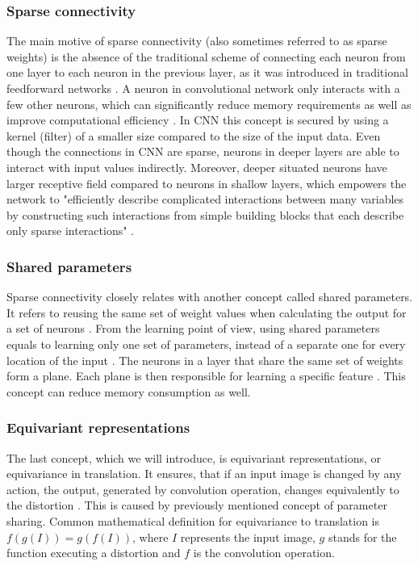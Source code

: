\subsubsection*{Sparse connectivity}
The main motive of sparse connectivity (also sometimes referred to as sparse weights) is the absence of the traditional scheme of connecting each neuron from one layer to each neuron in the previous layer, as it was introduced in traditional feedforward networks \cite{chapterBookDL}. A neuron in convolutional network only interacts with a few other neurons, which can significantly reduce memory requirements as well as improve computational efficiency \cite{deeplearningbook}. In CNN this concept is secured by using a kernel (filter) of a smaller size compared to the size of the input data. Even though the connections in CNN are sparse, neurons in deeper layers are able to interact with input values indirectly. Moreover, deeper situated neurons have larger receptive field compared to neurons in shallow layers, which empowers the network to "efficiently describe complicated interactions between many variables by constructing such interactions from simple building blocks that each describe only sparse interactions" \cite{deeplearningbook}.
\subsubsection*{Shared parameters}
Sparse connectivity closely relates with another concept called shared parameters. It refers to reusing the same set of weight values when calculating the output for a set of neurons \cite{greekDeepLearning}. From the learning point of view, using shared parameters equals to learning only one set of parameters, instead of a separate one for every location of the input \cite{deeplearningbook}. The neurons in a layer that share the same set of weights form a plane. Each plane is then responsible for learning a specific feature \cite{greekDeepLearning}. This concept can reduce memory consumption as well.
\subsubsection*{Equivariant representations}
The last concept, which we will introduce, is equivariant representations, or equivariance in translation. It ensures, that if an input image is changed by any action, the output, generated by convolution operation, changes equivalently to the distortion \cite{deeplearningbook}. This is caused by previously mentioned concept of parameter sharing. Common mathematical definition for equivariance to translation is $f(g(I)) = g(f(I))$, where $I$ represents the input image, $g$ stands for the function executing a distortion and $f$ is the convolution operation.

